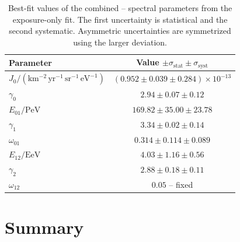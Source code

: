 \documentclass[main.tex]{subfiles}
\begin{document}
\begin{table}
    \centering
    \caption{
        Best-fit values of the combined -- spectral parameters
        from the exposure-only fit. The first uncertainty is statistical and
        the second systematic. Asymmetric uncertainties are symmetrized using
        the larger deviation.
    }
    \label{table:combined_spectrum_parameters_systematics}
    \begin{tabular}{lc}
        \hline
        Parameter & Value $\pm\sigma_{\mathrm{stat}}\pm\sigma_{\mathrm{syst}}$ \\
        \hline
        $J_0/\left(\mathrm{km^{-2}\,yr^{-1}\,sr^{-1}\,eV^{-1}}\right)$
        & $(0.952\pm0.039\pm0.284)\times10^{-13}$ \\
        $\gamma_0$ & $2.94\pm0.07\pm0.12$ \\
        $E_{01}/\mathrm{PeV}$ & $169.82\pm35.00\pm23.78$ \\
        $\gamma_1$ & $3.34\pm0.02\pm0.14$ \\
        $\omega_{01}$ & $0.314\pm0.114\pm0.089$ \\
        $E_{12}/\mathrm{EeV}$ & $4.03\pm1.16\pm0.56$ \\
        $\gamma_2$ & $2.88\pm0.18\pm0.11$ \\
        $\omega_{12}$ & $0.05$ -- fixed \\
        \hline
    \end{tabular}
\end{table}

\section{Summary}
\end{document}
